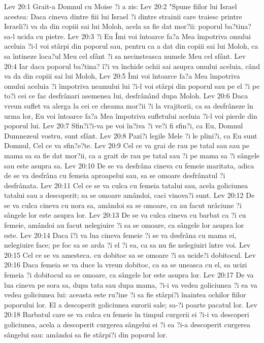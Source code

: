Lev 20:1  Grait-a Domnul cu Moise ?i a zis:
Lev 20:2  "Spune fiilor lui Israel acestea: Daca cineva dintre fiii lui Israel ?i dintre strainii care traiesc printre Israeli?i va da din copiii sai lui Moloh, acela sa fie dat mor?ii: poporul ba?tina? sa-l ucida cu pietre.
Lev 20:3  ?i Eu Îmi voi întoarce fa?a Mea împotriva omului aceluia ?i-l voi stârpi din poporul sau, pentru ca a dat din copiii sai lui Moloh, ca sa întineze loca?ul Meu cel sfânt ?i sa necinsteasca numele Meu cel sfânt.
Lev 20:4  Iar daca poporul ba?tina? î?i va închide ochii sai asupra omului aceluia, când va da din copiii sai lui Moloh,
Lev 20:5  Îmi voi întoarce fa?a Mea împotriva omului aceluia ?i împotriva neamului lui ?i-l voi stârpi din poporul sau pe el ?i pe to?i cei ce fac desfrânari asemenea lui, desfrânând dupa Moloh.
Lev 20:6  Daca vreun suflet va alerga la cei ce cheama mor?ii ?i la vrajitorii, ca sa desfrâneze în urma lor, Eu voi întoarce fa?a Mea împotriva sufletului aceluia ?i-l voi pierde din poporul lui.
Lev 20:7  Sfin?i?i-va pe voi în?iva ?i ve?i fi sfin?i, ca Eu, Domnul Dumnezeul vostru, sunt sfânt.
Lev 20:8  Pazi?i legile Mele ?i le plini?i, ca Eu sunt Domnul, Cel ce va sfin?e?te.
Lev 20:9  Cel ce va grai de rau pe tatal sau sau pe mama sa sa fie dat mor?ii, ca a grait de rau pe tatal sau ?i pe mama sa ?i sângele sau este asupra sa.
Lev 20:10  De se va desfrâna cineva cu femeie maritata, adica de se va desfrâna cu femeia aproapelui sau, sa se omoare desfrânatul ?i desfrânata.
Lev 20:11  Cel ce se va culca cu femeia tatalui sau, acela goliciunea tatalui sau a descoperit; sa se omoare amândoi, caci vinova?i sunt.
Lev 20:12  De se va culca cineva cu nora sa, amândoi sa se omoare, ca au facut urâciune ?i sângele lor este asupra lor.
Lev 20:13  De se va culca cineva cu barbat ca ?i cu femeie, amândoi au facut nelegiuire ?i sa se omoare, ca sângele lor asupra lor este.
Lev 20:14  Daca î?i va lua cineva femeie ?i se va desfrâna cu mama ei, nelegiuire face; pe foc sa se arda ?i el ?i ea, ca sa nu fie nelegiuiri între voi.
Lev 20:15  Cel ce se va amesteca. cu dobitoc sa se omoare ?i sa ucide?i dobitocul.
Lev 20:16  Daca femeia se va duce la vreun dobitoc, ca sa se uneasca cu el, sa ucizi femeia ?i dobitocul sa se omoare, ca sângele lor este asupra lor.
Lev 20:17  De va lua cineva pe sora sa, dupa tata sau dupa mama, ?i-i va vedea goliciunea ?i ea va vedea goliciunea lui: aceasta este ru?ine ?i sa fie stârpi?i înaintea ochilor fiilor poporului lor. El a descoperit goliciunea surorii sale; sa-?i poarte pacatul lor.
Lev 20:18  Barbatul care se va culca cu femeie în timpul curgerii ei ?i-i va descoperi goliciunea, acela a descoperit curgerea sângelui ei ?i ea ?i-a descoperit curgerea sângelui sau: amândoi sa fie stârpi?i din poporul lor.
